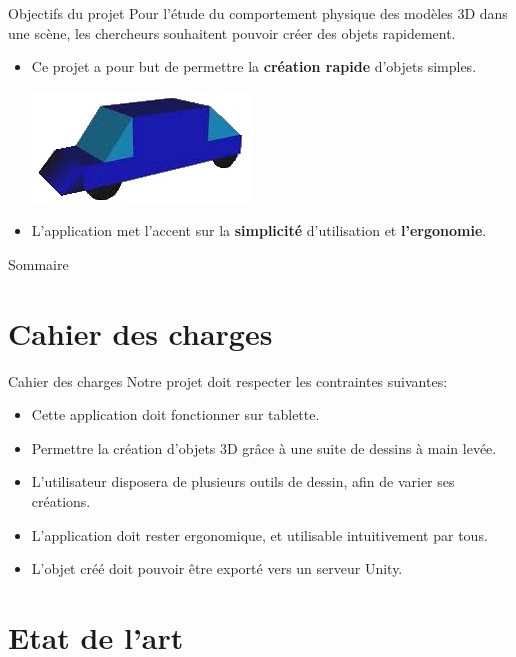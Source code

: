 \documentclass[a4paper,10pt]{beamer}
\begin{document}
	\begin{frame}{Objectifs du projet}
		Pour l'étude du comportement physique des modèles 3D dans une scène, les chercheurs souhaitent pouvoir créer des objets rapidement.
		
		
		\begin{itemize}
			\item Ce projet a pour but de permettre la \textbf{création rapide} d'objets simples.
			\centerline{\includegraphics[scale=0.5]{images/intro/car.jpg}}
			\item L'application met l'accent sur la \textbf{simplicité} d'utilisation et \textbf{l'ergonomie}.
		\end{itemize}
		
	\end{frame}
	
	\begin{frame}{Sommaire}
		\tableofcontents
	\end{frame}
	
	\section{Cahier des charges}
	
	\begin{frame}{Cahier des charges}
		Notre projet doit respecter les contraintes suivantes:
		\begin{itemize}
			\item Cette application doit fonctionner sur tablette.
			\item Permettre la création d'objets 3D grâce à une suite de dessins à main levée.
			\item L'utilisateur disposera de plusieurs outils de dessin, afin de varier ses créations.
			\item L'application doit rester ergonomique, et utilisable intuitivement par tous.
			\item L'objet créé doit pouvoir être exporté vers un serveur Unity.
		\end{itemize}
	\end{frame}
	
	\section{Etat de l'art}
	
\end{document}
